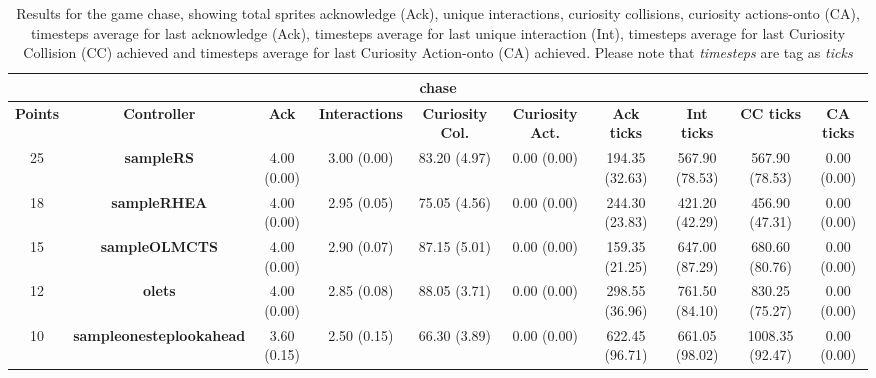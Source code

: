 \begin{table*}[!t]
\begin{center}
\begin{adjustbox}{width=1\textwidth}
\begin{tabular}{|c|c|c|c|c|c|c|c|c|c|}
\multicolumn{10}{c}{\textbf{chase}}\\
\hline
\textbf{Points} & \textbf{Controller} & \textbf{Ack} & \textbf{Interactions} & \textbf{Curiosity Col.} & \textbf{Curiosity Act.} & \textbf{Ack ticks} & \textbf{Int ticks} & \textbf{CC ticks} & \textbf{CA ticks}\\
\hline
25 & \textbf{sampleRS} & 4.00 (0.00) & 3.00 (0.00) & 83.20 (4.97) & 0.00 (0.00) & 194.35 (32.63) & 567.90 (78.53) & 567.90 (78.53) & 0.00 (0.00)
 \\
\hline
18 & \textbf{sampleRHEA} & 4.00 (0.00) & 2.95 (0.05) & 75.05 (4.56) & 0.00 (0.00) & 244.30 (23.83) & 421.20 (42.29) & 456.90 (47.31) & 0.00 (0.00)
 \\
\hline
15 & \textbf{sampleOLMCTS} & 4.00 (0.00) & 2.90 (0.07) & 87.15 (5.01) & 0.00 (0.00) & 159.35 (21.25) & 647.00 (87.29) & 680.60 (80.76) & 0.00 (0.00)
 \\
\hline
12 & \textbf{olets} & 4.00 (0.00) & 2.85 (0.08) & 88.05 (3.71) & 0.00 (0.00) & 298.55 (36.96) & 761.50 (84.10) & 830.25 (75.27) & 0.00 (0.00)
 \\
\hline
10 & \textbf{sampleonesteplookahead} & 3.60 (0.15) & 2.50 (0.15) & 66.30 (3.89) & 0.00 (0.00) & 622.45 (96.71) & 661.05 (98.02) & 1008.35 (92.47) & 0.00 (0.00)
 \\
\hline
\end{tabular}
\end{adjustbox}
\caption{Results for the game chase, showing total sprites acknowledge (Ack), unique interactions, curiosity collisions, curiosity actions-onto (CA), timesteps average for last acknowledge (Ack),  timesteps average for last unique interaction (Int), timesteps average for last Curiosity Collision (CC) achieved and timesteps average for last Curiosity Action-onto (CA) achieved. Please note that \textit{timesteps} are tag as \textit{ticks}}
\label{tab:weights}
\end{center}
\end{table*}
